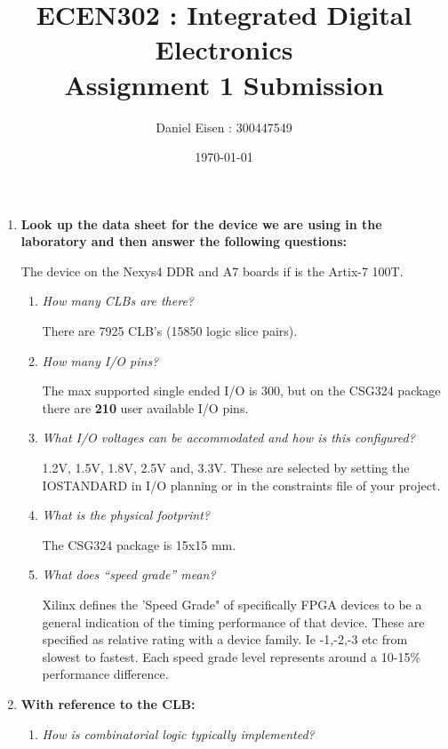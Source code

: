 \documentclass[11pt]{article}
\title{ECEN302 : Integrated Digital Electronics \\ Assignment 1 Submission}
\author{Daniel Eisen : 300447549}
\date{\today}
\begin{document}
\begin{preview}
\maketitle
\begin{enumerate}
  \item \textbf{Look up the data sheet for the device we are using in the laboratory and then answer the following questions:}

  The device on the Nexys4 DDR and A7 boards if is the Artix-7 100T.
  \begin{enumerate}
    \item \textit{How many CLBs are there?}

    There are 7925 CLB's  (15850 logic slice pairs).
    
    \item \textit{How many I/O pins?}

    The max supported single ended I/O is 300, but on the CSG324 package there are \textbf{210} user  available I/O pins. 

    \item \textit{What I/O voltages can be accommodated and how is this configured?}

    1.2V, 1.5V, 1.8V, 2.5V and, 3.3V. These are selected by setting the IOSTANDARD in I/O planning or in the constraints file of your project.
    
    \item \textit{What is the physical footprint?}

    The CSG324 package is 15x15 mm.

    \item \textit{What does “speed grade” mean?}

    Xilinx defines the 'Speed Grade" of specifically FPGA devices to be a general indication of the timing performance of that device. These are specified as relative rating with a device family. Ie -1,-2,-3 etc from slowest to fastest.
    Each speed grade level represents around a 10-15\% performance difference.

  \end{enumerate}

  \item \textbf{With reference to the CLB:}
  \begin{enumerate}
    \item \textit{How is combinatorial logic typically implemented?}
    

\end{enumerate}
\end{enumerate}
\end{preview}
\end{document}
